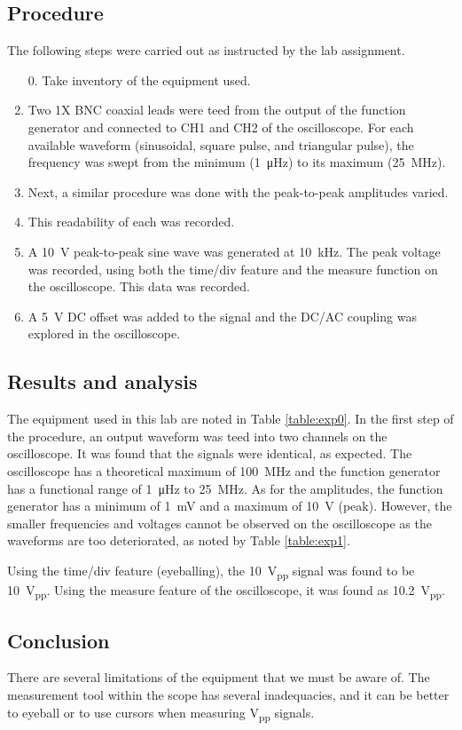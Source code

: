 \documentclass{report}
\newcommand{\pp}{_{pp}}
\newcommand{\Vpp}{\V\pp}
\begin{document}
\subsection{Procedure}
The following steps were carried out as instructed by the lab assignment.
\begin{enumerate}
	\item[0.] Take inventory of the equipment used.
	\item Two 1X BNC coaxial leads were teed from the output of the function generator and connected to CH1 and CH2 of the oscilloscope. For each available waveform (sinusoidal, square pulse, and triangular pulse), the frequency was swept from the minimum (\SI{1}{\micro\Hz}) to its maximum (\SI{25}{\mega\Hz}).
	\item Next, a similar procedure was done with the peak-to-peak amplitudes varied.
	\item This readability of each was recorded.
	\item A \SI{10}{\V} peak-to-peak sine wave was generated at \SI{10}{\kilo\Hz}. The peak voltage was recorded, using both the time/div feature and the measure function on the oscilloscope. This data was recorded.
	\item A \SI{5}{\V} DC offset was added to the signal and the DC/AC coupling was explored in the oscilloscope.
\end{enumerate}

\subsection{Results and analysis}
The equipment used in this lab are noted in Table \ref{table:exp0}. In the first step of the procedure, an output waveform was teed into two channels on the oscilloscope. It was found that the signals were identical, as expected. The oscilloscope has a theoretical maximum of \SI{100}{\mega\Hz} and the function generator has a functional range of \SI{1}{\micro\Hz} to \SI{25}{\mega\Hz}. As for the amplitudes, the function generator has a minimum of \SI{1}{\milli\V} and a maximum of \SI{10}{\V} (peak). However, the smaller frequencies and voltages cannot be observed on the oscilloscope as the waveforms are too deteriorated, as noted by Table \ref{table:exp1}.

Using the time/div feature (eyeballing), the \SI{10}{\Vpp} signal was found to be \SI{10}{\Vpp}. Using the measure feature of the oscilloscope, it was found as \SI{10.2}{\Vpp}.

\subsection{Conclusion}
There are several limitations of the equipment that we must be aware of. The measurement tool within the scope has several inadequacies, and it can be better to eyeball or to use cursors when measuring \si{\Vpp} signals.
\end{document}
